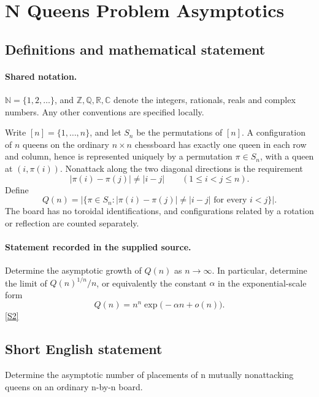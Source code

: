 \documentclass[11pt]{article}
\newcommand{\sref}[2]{\hyperlink{source:#1:#2}{[S#2]}}
\begin{document}
\section{N Queens Problem Asymptotics}\label{statement}

\subsection{Definitions and mathematical statement}

\paragraph{Shared notation.}$\mathbb N=\{1,2,\ldots\}$, and $\mathbb Z,\mathbb Q,\mathbb R,\mathbb C$ denote the integers, rationals, reals and complex numbers. Any other conventions are specified locally.


Write $[n]=\{1,\ldots,n\}$, and let $S_n$ be the permutations of $[n]$. A configuration of $n$ queens on the ordinary $n\times n$ chessboard has exactly one queen in each row and column, hence is represented uniquely by a permutation $\pi\in S_n$, with a queen at $(i,\pi(i))$. Nonattack along the two diagonal directions is the requirement
\[
 |\pi(i)-\pi(j)|\ne |i-j|\qquad(1\leq i<j\leq n).
\]
Define
\[
 Q(n)=\bigl|\{\pi\in S_n:|\pi(i)-\pi(j)|\ne|i-j|\text{ for every }i<j\}\bigr|.
\]
The board has no toroidal identifications, and configurations related by a rotation or reflection are counted separately.
\paragraph{Statement recorded in the supplied source.}
Determine the asymptotic growth of $Q(n)$ as $n\to\infty$. In particular, determine the limit of $Q(n)^{1/n}/n$, or equivalently the constant $\alpha$ in the exponential-scale form
\[
 Q(n)=n^n\exp\bigl(-\alpha n+o(n)\bigr).
\] \sref{statement}{2}
\subsection{Short English statement}
Determine the asymptotic number of placements of n mutually nonattacking queens on an ordinary n-by-n board.
\end{document}
